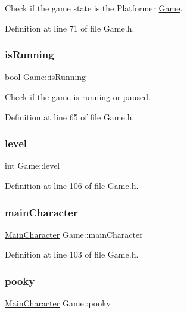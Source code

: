 Check if the game state is the Platformer \mbox{\hyperlink{class_game}{Game}}. 



Definition at line 71 of file Game.\+h.

\mbox{\label{class_game_adb424734b2454f9ed1e6d6bd44e6dfaf}} 
\subsubsection{\texorpdfstring{isRunning}{isRunning}}
{\footnotesize\ttfamily bool Game\+::is\+Running}



Check if the game is running or paused. 



Definition at line 65 of file Game.\+h.

\mbox{\label{class_game_abe14118bc7cb70c342636c2b2a15554b}} 
\subsubsection{\texorpdfstring{level}{level}}
{\footnotesize\ttfamily int Game\+::level}



Definition at line 106 of file Game.\+h.

\mbox{\label{class_game_a037a7a85c51d0d455cfcc3af08542904}} 
\subsubsection{\texorpdfstring{mainCharacter}{mainCharacter}}
{\footnotesize\ttfamily \mbox{\hyperlink{class_main_character}{Main\+Character}} Game\+::main\+Character}



Definition at line 103 of file Game.\+h.

\mbox{\label{class_game_a0f428f334dc8a0189d61e9d4a35a43b6}} 
\subsubsection{\texorpdfstring{pooky}{pooky}}
{\footnotesize\ttfamily \mbox{\hyperlink{class_main_character}{Main\+Character}} Game\+::pooky}



